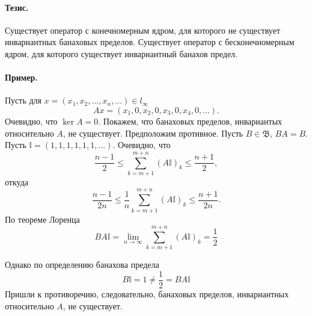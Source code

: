 \documentclass[a4paper,14pt]{article} %
\begin{document}

\paragraph{Тезис.}
Существует оператор с конечномерным ядром, для которого не существует инвариантных банаховых пределов.
Существует оператор с бесконечномерным ядром, для которого существует инвариантный банахов предел.

\paragraph{Пример.}

Пусть для $x = (x_1, x_2, ..., x_n, ...)\in l_\infty$
\begin{equation}
	Ax = (x_1, 0, x_2, 0, x_3, 0, x_4, 0, ...).
\end{equation}
Очевидно, что $\ker A = {0}$.
Покажем, что банаховых пределов, инвариантых относительно $A$, не существует.
Предположим противное.
Пусть $B\in\mathfrak{B}$, $BA = B$.
Пусть $\mathbb{I} = (1, 1, 1, 1, 1, 1, ...)$.
Очевидно, что
%
\begin{equation}
	\frac{n-1}{2}\leqslant \sum_{k=m+1}^{m+n} (A\mathbb{I})_k \leqslant \frac{n+1}{2},
\end{equation}
откуда
\begin{equation}
	\frac{n-1}{2n}\leqslant \frac{1}{n}\sum_{k=m+1}^{m+n} (A\mathbb{I})_k \leqslant \frac{n+1}{2n}.
\end{equation}
По теореме Лоренца
\begin{equation}
	BA\mathbb{I} = 
	\lim_{n\to\infty} \sum_{k=m+1}^{m+n} (A\mathbb{I})_k = \frac{1}{2}
\end{equation}

Однако по определению банахова предела
\begin{equation}
	B\mathbb{I} = 1 \neq \frac{1}{2} = BA\mathbb{I}
\end{equation}
Пришли к противоречию, следовательно, банаховых пределов, инвариантных относительно $A$, не существует.
\end{document}
